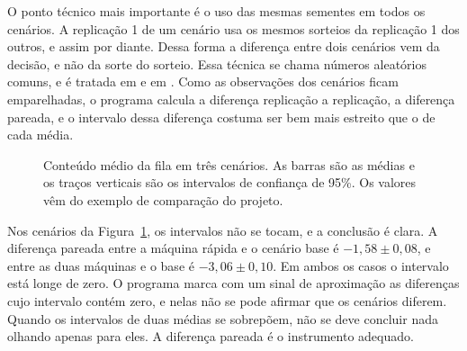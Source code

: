 O ponto técnico mais importante é o uso das mesmas sementes em todos os cenários. A replicação 1 de um cenário usa os mesmos sorteios da replicação 1 dos outros, e assim por diante. Dessa forma a diferença entre dois cenários vem da decisão, e não da sorte do sorteio. Essa técnica se chama números aleatórios comuns, e é tratada em \textcite{kleijnen2008} e em \textcite{law2015}. Como as observações dos cenários ficam emparelhadas, o programa calcula a diferença replicação a replicação, a diferença pareada, e o intervalo dessa diferença costuma ser bem mais estreito que o de cada média.

\begin{figure}[ht]
\centering
{}
\caption{Conteúdo médio da fila em três cenários. As barras são as médias e os traços verticais são os intervalos de confiança de 95\%. Os valores vêm do exemplo de comparação do projeto.}
\label{fig-cenarios}
\end{figure}

Nos cenários da Figura~\ref{fig-cenarios}, os intervalos não se tocam, e a conclusão é clara. A diferença pareada entre a máquina rápida e o cenário base é $-1{,}58 \pm 0{,}08$, e entre as duas máquinas e o base é $-3{,}06 \pm 0{,}10$. Em ambos os casos o intervalo está longe de zero. O programa marca com um sinal de aproximação as diferenças cujo intervalo contém zero, e nelas não se pode afirmar que os cenários diferem. Quando os intervalos de duas médias se sobrepõem, não se deve concluir nada olhando apenas para eles. A diferença pareada é o instrumento adequado.

